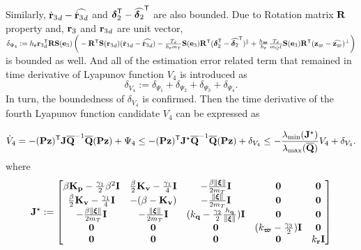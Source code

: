 \documentclass[journal,onecolumn]{IEEEtran}
\begin{document}
Similarly, $\rzddot-\widehat{\rzddot}$ and $\boldsymbol{\delta}_2^\mathsf{T}-\widehat{\boldsymbol{\delta}_2}^\mathsf{T}$ are also bounded.
Due to Rotation matrix $\RotM$ property and, $\rz$ and $\rzd$ are unit vector, $\delta_{\Psi_4}:=h_\v{r}\rzd\trs \RotM\Skew{\ez}\LP
\vphantom{\LP\frac{\partial V_4}{\partial\vL}\dir\RP\trs}
-\RotM[T]\Skew{\rzd}(\rzddot-\widehat{\rzddot})
-\frac{T_d}{h_\v{r}\mT}\Skew{\ez}\RotM[T](\bs{\delta}_2\trs-\widehat{\bs{\delta}_2}\trs)^{\|}
+\frac{h_{\bs\varpi}}{h_\v{r}}\frac{T_d}{\mQ\ellp}\Skew{\ez}\RotM[T](\zc-\widehat{\zc})^{\perp}\RP$ is bounded as well.
And all of the estimation error related term that remained in time derivative of Lyapunov function $V_4$ is introduced as
%
\begin{equation}
	\delta_{V_4} := \delta_{\Psi_1} + \delta_{\Psi_2} + \delta_{\Psi_3} + \delta_{\Psi_4}.
\end{equation}
%
In turn, the boundedness of $\delta_{V_4}$ is confirmed.
Then the time derivative of the fourth Lyapunov function candidate $V_4$ can be expressed as
%

\begin{equation}
	\dot{V}_4 = -(\mathbf{P}\mathbf{z})^\mathsf{T}\mathbf{J}\overline{\mathbf{Q}}^{-1}\overline{\mathbf{Q}}(\mathbf{P}\mathbf{z}) + \Psi_4
	\leq
	-(\mathbf{P}\mathbf{z})^\mathsf{T}\mathbf{J}^{\star}\overline{\mathbf{Q}}^{-1}\overline{\mathbf{Q}}(\mathbf{P}\mathbf{z}) + \delta_{V_4}
	\leq -\frac{\lambda_{\min}(\mathbf{J}^{\star})}{\lambda_{\max}(\overline{\mathbf{Q}})}V_4+ \delta_{V_4}.
\end{equation}
%
where
%
\begin{align}
	\v{J}^{\star} := \begin{bmatrix}
		\beta{\bf K_p}-\frac{\gamma_1}{2} \beta^2\v{I} & \frac{\beta}{2}{\bf K_v}-\frac{\gamma_1}{4}\v{I} & -\frac{\beta\|\Xiq\|}{2\mT}\v{I} & \v{0} & \v{0} \\
		\frac{\beta}{2}{\bf K_v} - \frac{\gamma_1}{4}\v{I}& -(\beta-{\bf K_v}) & -\frac{\|\Xiq\|}{2\mT}\v{I} & \v{0} & \v{0}  \\
		-\frac{\beta\|\Xiq\|}{2\mT}\v{I} & -\frac{\|\Xiq\|}{2\mT}\v{I} & (k_\v{q}-\frac{\gamma_2}{2} \frac{h_\v{q}}{\|\Xiq\|})\v{I} & \v{0} & \v{0} \\
		\v{0} & \v{0} & \v{0} & (k_{\bs{\varpi}}-\frac{\gamma_3}{2})\v{I} & \v{0}\\
		\v{0} & \v{0} & \v{0} & \v{0} & k_\v{r}\v{I} \\
	\end{bmatrix} \nonumber
\end{align}
\end{document}
